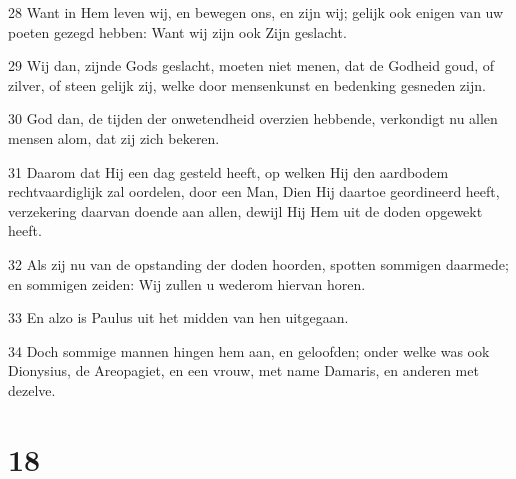 \par 28 Want in Hem leven wij, en bewegen ons, en zijn wij; gelijk ook enigen van uw poeten gezegd hebben: Want wij zijn ook Zijn geslacht.
\par 29 Wij dan, zijnde Gods geslacht, moeten niet menen, dat de Godheid goud, of zilver, of steen gelijk zij, welke door mensenkunst en bedenking gesneden zijn.
\par 30 God dan, de tijden der onwetendheid overzien hebbende, verkondigt nu allen mensen alom, dat zij zich bekeren.
\par 31 Daarom dat Hij een dag gesteld heeft, op welken Hij den aardbodem rechtvaardiglijk zal oordelen, door een Man, Dien Hij daartoe geordineerd heeft, verzekering daarvan doende aan allen, dewijl Hij Hem uit de doden opgewekt heeft.
\par 32 Als zij nu van de opstanding der doden hoorden, spotten sommigen daarmede; en sommigen zeiden: Wij zullen u wederom hiervan horen.
\par 33 En alzo is Paulus uit het midden van hen uitgegaan.
\par 34 Doch sommige mannen hingen hem aan, en geloofden; onder welke was ook Dionysius, de Areopagiet, en een vrouw, met name Damaris, en anderen met dezelve.

\chapter{18}


